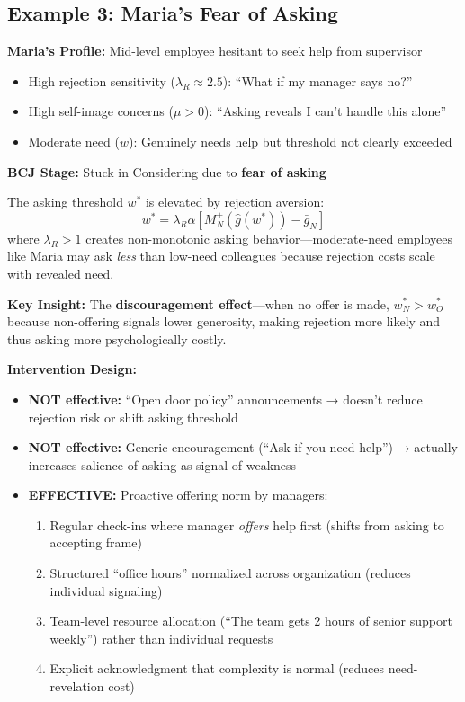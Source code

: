 \subsection{Example 3: Maria's Fear of Asking}
\label{subsec:example-fear-asking}

\textbf{Maria's Profile:} Mid-level employee hesitant to seek help from supervisor

\begin{itemize}
    \item High rejection sensitivity ($\lambda_R \approx 2.5$): ``What if my manager says no?''
    \item High self-image concerns ($\mu > 0$): ``Asking reveals I can't handle this alone''
    \item Moderate need ($w$): Genuinely needs help but threshold not clearly exceeded
\end{itemize}

\textbf{BCJ Stage:} Stuck in Considering due to \textbf{fear of asking} \citep{benabou2022hurts}

The asking threshold $w^*$ is elevated by rejection aversion:
\begin{equation}
w^* = \lambda_R \alpha [M^+_N(\hat{g}(w^*)) - \bar{g}_N]
\end{equation}
where $\lambda_R > 1$ creates non-monotonic asking behavior---moderate-need employees
like Maria may ask \emph{less} than low-need colleagues because rejection costs scale
with revealed need.

\textbf{Key Insight:} The \textbf{discouragement effect}---when no offer is made,
$w^*_N > w^*_O$ because non-offering signals lower generosity, making rejection
more likely and thus asking more psychologically costly.

\textbf{Intervention Design:}
\begin{itemize}
    \item \textbf{NOT effective:} ``Open door policy'' announcements → doesn't reduce
    rejection risk or shift asking threshold
    \item \textbf{NOT effective:} Generic encouragement (``Ask if you need help'') →
    actually increases salience of asking-as-signal-of-weakness
    \item \textbf{EFFECTIVE:} Proactive offering norm by managers:
    \begin{enumerate}
        \item Regular check-ins where manager \emph{offers} help first (shifts from
        asking to accepting frame)
        \item Structured ``office hours'' normalized across organization (reduces
        individual signaling)
        \item Team-level resource allocation (``The team gets 2 hours of senior
        support weekly'') rather than individual requests
        \item Explicit acknowledgment that complexity is normal (reduces need-revelation cost)
    \end{enumerate}
\end{itemize}

